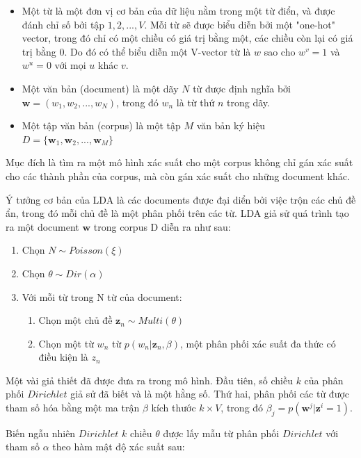 \documentclass[12pt,a4paper]{article}
\begin{document}
\begin{itemize}
\item Một từ là một đơn vị cơ bản của dữ liệu nằm trong một từ điển, và được đánh chỉ số bởi tập ${1, 2,..., V}$. Mỗi từ sẽ được biểu diễn bởi một "one-hot" vector, trong đó chỉ có một chiều có giá trị bằng một, các chiều còn lại có giá trị bằng 0. Do đó có thể biểu diễn một V-vector từ là $w$ sao cho $w^v = 1$ và $w^u = 0$ với mọi $u$ khác $v$.
\item Một văn bản (document) là một dãy $N$ từ được định nghĩa bởi $\textbf{w} = (w_1, w_2,..., w_N)$, trong đó $w_n$ là từ thứ $n$ trong dãy.
\item Một tập văn bản (corpus) là một tập $M$ văn bản ký hiệu $D = \{\textbf{w}_1, \textbf{w}_2,..., \textbf{w}_M\}$

\end{itemize}
Mục đích là tìm ra một mô hình xác suất cho một corpus không chỉ gán xác suất cho các thành phần của corpus, mà còn gán xác suất cho những document khác.


Ý tưởng cơ bản của LDA là các documents được đại diển bởi việc trộn các chủ đề ẩn, trong đó mỗi chủ đề là một phân phối trên các từ. LDA giả sử quá trình tạo ra một document $\textbf{w}$ trong corpus D diễn ra như sau:

\begin{enumerate}
\item Chọn $N \sim Poisson(\xi)$
\item Chọn $\theta \sim Dir(\alpha)$
\item Với mỗi từ trong N từ của document:

	\begin{enumerate}
	\item Chọn một chủ đề $\textbf{z}_n \sim Multi(\theta)$
	\item Chọn một từ $w_n$ từ $p(w_n | \textbf{z}_n, \beta)$, một phân phối xác suất đa thức có điều kiện là $z_n$
	\end{enumerate}
\end{enumerate}

Một vài giả thiết đã được đưa ra trong mô hình. Đầu tiên, số chiều $k$ của phân phối $Dirichlet$ giả sử đã biết và là một hằng số. Thứ hai, phân phối các từ được tham số hóa bằng một ma trận $\beta$ kích thước $k \times V$, trong đó ${\beta}_j = p(\textbf{w}^j | \textbf{z}^i = 1)$.


Biến ngẫu nhiên $Dirichlet$ $k$ chiều $\theta$ được lấy mẫu từ phân phối $Dirichlet$ với tham số $\alpha$ theo hàm mật độ xác suất sau:
\end{document}
